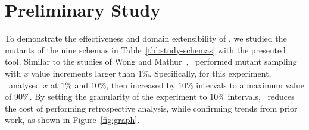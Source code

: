 \section{Preliminary Study}


To demonstrate the effectiveness and domain extensibility of \mrstudyr, we studied the mutants of the nine schemas in
Table~\ref{tbl:study-schemas} with the presented tool. Similar to the studies of Wong and
Mathur~\cite{mathur1994empirical}, \mr~performed mutant sampling with $x$ value increments larger than $1\%$.
Specifically, for this experiment, \mr~analysed $x$ at $1\%$ and $10\%$, then increased by $10\%$ intervals to a maximum
value of $90\%$. By setting the granularity of the experiment to $10\%$ intervals, \mr~reduces the cost of performing
retrospective analysis, while confirming trends from prior work, as shown in Figure~\ref{fig:graph}.








